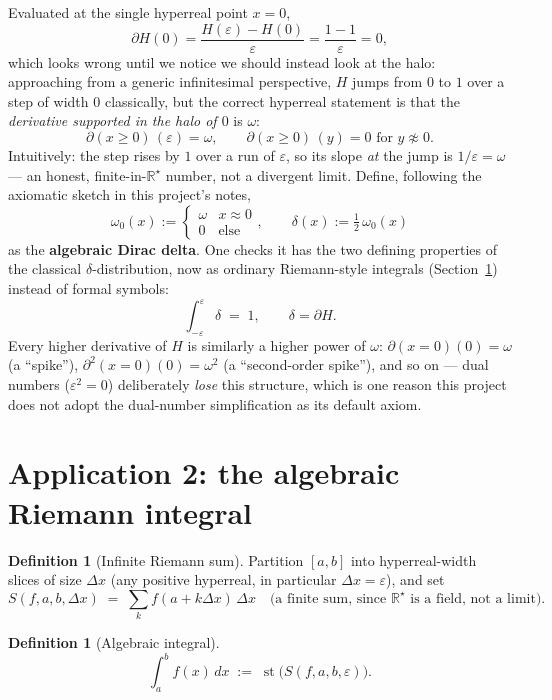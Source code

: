 \documentclass[11pt]{article}
\theoremstyle{definition}
\newtheorem{definition}[theorem]{Definition}
\theoremstyle{remark}
\newcommand{\Rstar}{\mathbb{R}^{\star}}
\newcommand{\eps}{\varepsilon}
\newcommand{\st}{\operatorname{st}}
\begin{document}
Evaluated at the single hyperreal point $x=0$,
\[
\partial H(0) = \frac{H(\eps)-H(0)}{\eps} = \frac{1-1}{\eps} = 0,
\]
which looks wrong until we notice we should instead look at the halo:
approaching from a generic infinitesimal perspective, $H$ jumps from $0$
to $1$ over a step of width $0$ classically, but the correct hyperreal
statement is that the \emph{derivative supported in the halo of $0$}
is $\omega$:
\[
\partial(x \ge 0)\,(\eps) = \omega, \qquad \partial(x\ge0)\,(y) = 0 \text{ for } y \not\approx 0.
\]
Intuitively: the step rises by $1$ over a run of $\eps$, so its slope
\emph{at} the jump is $1/\eps = \omega$ — an honest, finite-in-$\Rstar$
number, not a divergent limit. Define, following the axiomatic sketch in
this project's notes,
\[
\omega_0(x) := \begin{cases}\omega & x \approx 0\\ 0 & \text{else}\end{cases},
\qquad
\boxed{\delta(x) := \tfrac12\,\omega_0(x)}
\]
as the \textbf{algebraic Dirac delta}. One checks it has the two defining
properties of the classical $\delta$-distribution, now as ordinary
Riemann-style integrals (Section~\ref{sec:integral}) instead of formal
symbols:
\[
\int_{-\eps}^{\eps} \delta \;=\; 1, \qquad \delta = \partial H.
\]
Every higher derivative of $H$ is similarly a higher power of $\omega$:
$\partial(x{=}0)(0) = \omega$ (a ``spike''), $\partial^2(x{=}0)(0) =
\omega^2$ (a ``second-order spike''), and so on — dual numbers ($\eps^2=0$)
deliberately \emph{lose} this structure, which is one reason this project
does not adopt the dual-number simplification as its default axiom.

\section{Application 2: the algebraic Riemann integral}\label{sec:integral}

\begin{definition}[Infinite Riemann sum]
Partition $[a,b]$ into hyperreal-width slices of size $\Delta x$ (any
positive hyperreal, in particular $\Delta x = \eps$), and set
\[
S(f,a,b,\Delta x) \;=\; \sum_{k} f(a+k\Delta x)\,\Delta x
\quad\text{(a finite sum, since $\Rstar$ is a field, not a limit)}.
\]
\end{definition}

\begin{definition}[Algebraic integral]
\[
\int_a^b f(x)\,dx \;:=\; \st\big(S(f,a,b,\eps)\big).
\]
\end{definition}
\end{document}
